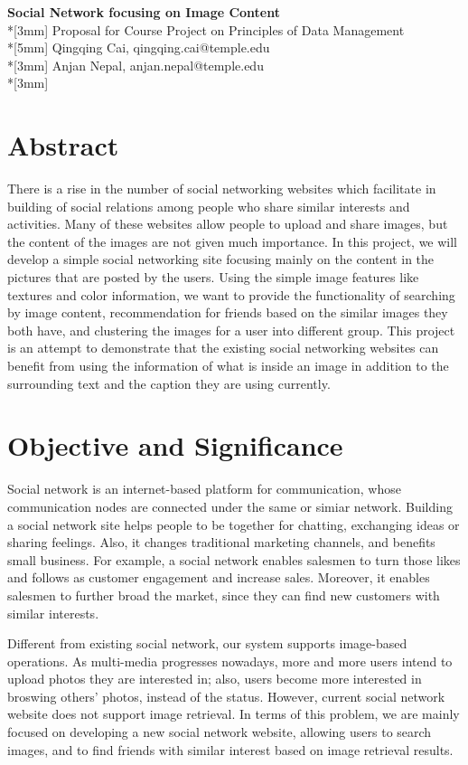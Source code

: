 \documentclass[a4paper,12pt]{article}
\begin{document}
\begin{center}
{\Large{\bf Social Network focusing on Image Content}} \\*[3mm]
Proposal for Course Project on Principles of Data Management\\*[5mm]
Qingqing Cai, qingqing.cai@temple.edu\\*[3mm]
Anjan Nepal, anjan.nepal@temple.edu\\*[3mm]
\end{center}

\section*{Abstract}
There is a rise in the number of social networking websites which facilitate in building of social relations among people who share similar interests and activities. Many of these websites allow people to upload and share images, but the content of the images are not given much importance. In this project, we will develop a simple social networking site focusing mainly on the content in the pictures that are posted by the users. Using the simple image features like textures and color information, we want to provide the functionality of searching by image content, recommendation for friends based on the similar images they both have, and clustering the images for a user into different group. This project is an attempt to demonstrate that the existing social networking websites can benefit from using the information of what is inside an image in addition to the surrounding text and the caption they are using currently.

\section*{Objective and Significance}
Social network is an internet-based platform for communication, whose communication nodes are connected under the same or simiar network. Building a social network site helps people to be together for chatting, exchanging ideas or sharing feelings. Also, it changes traditional marketing channels, and benefits small business. For example, a social network enables salesmen to turn those likes and follows as customer engagement and increase sales. Moreover, it enables salesmen to further broad the market, since they can find new customers with similar interests.

Different from existing social network, our system supports image-based operations. As multi-media progresses nowadays, more and more users intend to upload photos they are interested in; also, users become more interested in broswing others' photos, instead of the status. However, current social network website does not support image retrieval. In terms of this problem, we are mainly focused on developing a new social network website, allowing users to search images, and to find friends with similar interest based on image retrieval results.
\end{document}
